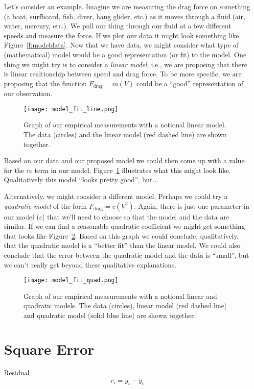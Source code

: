 Let's consider an example.  Imagine we are measuring the drag force on something (a boat, surfboard, fish, diver, hang glider, etc.) as it moves through a fluid (air, water, mercury, etc.).  We pull our thing through our fluid at a few different speeds and measure the force.  If we plot our data it might look something like Figure~\ref{f:modeldata}.  Now that we have data, we might consider what type of (mathematical) model would be a good representation (or fit) to the model.  One thing we might try is to consider a \emph{linear model}, i.e., we are proposing that there is linear realtionship between speed and drag force.  To be more specific, we are proposing that the function $F_{\mathrm{drag}}=m(V)$ could be a ``good'' representation of our observation.
\begin{figure}[hb!]
\centering
\texttt{[image: model\_fit\_line.png]}
\caption{Graph of our empirical measurements with a notional linear model.  The data (circles) and the linear model (red dashed line) are shown together.}
\label{f:modelline}
\end{figure}
Based on our data and our proposed model we could then come up with a value for the $m$ term in our model.  Figure~\ref{f:modelline} illustrates what this might look like.  Qualitatively this model ``looks pretty good'', but...

Alternatively, we might consider a different model.  Perhaps we could try a \emph{quadratic model} of the form $F_{\mathrm{drag}}=c(V^2)$.  Again, there is just one parameter in our model ($c$) that we'll need to choose so that the model and the data are similar. If we can find a reasonable quadratic coefficient we might get something that looks like Figure~\ref{f:modelquad}.  Based on this graph we could conclude, qualitatively, that the quadratic model is a ``better fit'' than the linear model.  We could also conclude that the error between the quadratic model and the data is ``small'', but we can't really get beyond these qualitative explanations.

\begin{figure}[bh!]
\centering
\texttt{[image: model\_fit\_quad.png]}
\caption{Graph of our empirical measurements with a notional linear and quadratic models.  The data (circles), linear model (red dashed line) and quadratic model (solid blue line) are shown together.}
\label{f:modelquad}
\end{figure}

\section{Square Error}

Residual
\[
r_i = y_i - \hat{y}_i
\]
